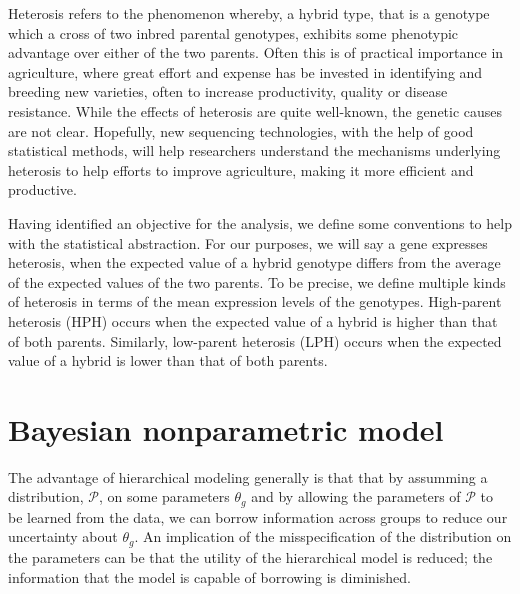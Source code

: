 Heterosis refers to the phenomenon whereby, a hybrid type, that is a genotype which a cross of two inbred parental genotypes, exhibits some phenotypic advantage over either of the two parents. Often this is of practical importance in agriculture, where great effort and expense has be invested in identifying and breeding new varieties, often to increase productivity, quality or disease resistance. While the effects of heterosis are quite well-known, the genetic causes are not clear. Hopefully, new sequencing technologies, with the help of good statistical methods, will help researchers understand the mechanisms underlying heterosis to help efforts to improve agriculture, making it more efficient and productive.


Having identified an objective for the analysis, we define some conventions to help with the statistical abstraction. For our purposes, we will say a gene expresses heterosis, when the expected value of a hybrid genotype differs from the average of the expected values of the two parents. To be precise, we define multiple kinds of heterosis in terms of the mean expression levels of the genotypes. High-parent heterosis (HPH) occurs when the expected value of a hybrid is higher than that of both parents. Similarly, low-parent heterosis (LPH) occurs when the expected value of a hybrid is lower than that of both parents.

\section{Bayesian nonparametric model}
The advantage of hierarchical modeling generally is that that by assumming a distribution, $\mathcal{P}$, on some parameters $\theta_g$ and by allowing the parameters of $\mathcal{P}$ to be learned from the data, we can borrow information across groups to reduce our uncertainty about $\theta_g$. An implication of the misspecification of the distribution on the parameters can be that the utility of the hierarchical model is reduced; the information that the model is capable of borrowing is diminished.

